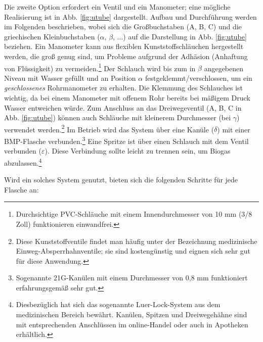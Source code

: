 \documentclass[]{article}
\begin{document}
Die zweite Option erfordert ein Ventil und ein Manometer; eine mögliche Realisierung ist in Abb. \ref{fig:utube} dargestellt.
Aufbau und Durchführung werden im Folgenden beschrieben, wobei sich die Großbuchstaben (A, B, C) und die griechischen Kleinbuchstaben ($\alpha$, $\beta$, ...) auf die Darstellung in Abb. \ref{fig:utube} beziehen.
Ein Manometer kann aus flexiblen Kunststoffschläuchen hergestellt werden, die groß genug sind, um Probleme aufgrund der Adhäsion (Anhaftung von Flüssigkeit) zu vermeiden.\footnote{Durchsichtige  PVC-Schläuche mit einem Innendurchmesser von 10 mm (3/8 Zoll) funktionieren einwandfrei.}
Der Schlauch wird bis zum in $\beta$ angegebenen Niveau mit Wasser gefüllt und an Position $\alpha$ festgeklemmt/verschlossen, um ein \textit{geschlossenes} Rohrmanometer zu erhalten.
Die Klemmung des Schlauches ist wichtig, da bei einem Manometer mit offenem Rohr bereits bei mäßigem Druck Wasser entweichen würde.
Zum Anschluss an das Dreiwegeventil (A, B, C in Abb. \ref{fig:utube}) können auch Schläuche mit kleinerem Durchmesser (bei $\gamma$) verwendet werden.\footnote{Diese Kunststoffventile findet man häufig unter der Bezeichnung \glqq medizinische Einweg-Absperrhahnventile\grqq{}; sie sind kostengünstig und eignen sich sehr gut für diese Anwendung.}
Im Betrieb wird das System über eine Kanüle ($\delta$) mit einer BMP-Flasche verbunden.\footnote{Sogenannte \glqq 21G-Kanülen\grqq{} mit einem Durchmesser von 0,8 mm funktioniert erfahrungsgemäß sehr gut.}
Eine Spritze ist über einen Schlauch mit dem Ventil verbunden ($\varepsilon$).
Diese Verbindung sollte leicht zu trennen sein, um Biogas abzulassen.\footnote{Diesbezüglich hat sich das sogenannte \glqq Luer-Lock-System\grqq{} aus dem medizinischen Bereich bewährt. Kanülen, Spitzen und Dreiwegehähne sind mit entsprechenden Anschlüssen im online-Handel oder auch in Apotheken erhältlich.}


Wird ein solches System genutzt, bieten sich die folgenden Schritte für jede Flasche an:
\end{document}
